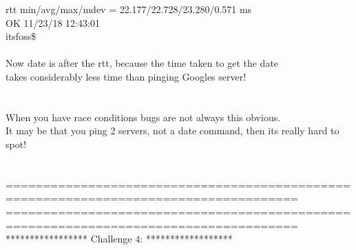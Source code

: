 \documentclass[10pt,a4paper]{article}
\begin{document}
{rtt min/avg/max/mdev = 22.177/22.728/23.280/0.571 ms\\
OK 11/23/18 12:43:01\\
itsfoss\$ \\
\\
Now date is after the rtt, because the time taken to get the date \\
takes considerably less time than pinging Googles server!\\
\\
\\
When you have race conditions bugs are not always this obvious.\\
It may be that you ping 2 servers, not a date command, then its really hard to spot!\\
\\
\\
=====================================================================================\\
=====================================================================================\\
*****************  Challenge 4:     ******************  \\
\\
\\
\\
\\
\\
\\
\\
\\
\\
\\
\\
\\
\\
\\
\\
\\
\\
\\
\\
\\
\\
\\
 \\
\\
\\
\\
\\
\\
\\
\\
\\
\\
}
\end{document}
